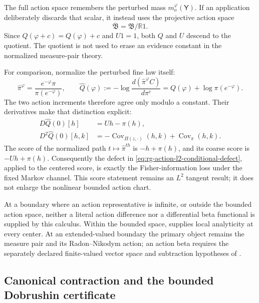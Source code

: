 The full action space remembers the perturbed mass
\(m_o^\varphi(\mathsf Y)\).  If an application deliberately discards that
scalar, it instead uses the projective action space
\begin{equation}
\overline{\mathfrak B}=\mathfrak B/\mathbb R1.
\label{eq:rg-projective-action-space}
\end{equation}
Since \(Q(\varphi+c)=Q(\varphi)+c\) and \(U1=1\), both \(Q\) and \(U\)
descend to the quotient.  The quotient is not used to erase an evidence
constant in the normalized measure-pair theory. 

For comparison, normalize the perturbed fine law itself:
\begin{equation}
\widehat\pi^\varphi
=\frac{e^{-\varphi}\pi}{\pi(e^{-\varphi})},
\qquad
\widehat Q(\varphi)
:=-\log\frac{d(\widehat\pi^\varphi C)}{d\pi^c}
=Q(\varphi)+\log\pi(e^{-\varphi}).
\label{eq:rg-normalized-perturbation-action}
\end{equation}
The two action increments therefore agree only modulo a constant.  Their
derivatives make that distinction explicit:
\begin{align}
D\widehat Q(0)[h]&=Uh-\pi(h),
\label{eq:rg-normalized-action-first-derivative}\\
D^2\widehat Q(0)[h,k]&=
-\operatorname{Cov}_{\Pi(z,\cdot)}(h,k)
+\operatorname{Cov}_{\pi}(h,k).
\label{eq:rg-normalized-action-second-derivative}
\end{align}
The score of the normalized path \(t\mapsto\widehat\pi^{th}\) is
\(-h+\pi(h)\), and its coarse score is
\(-Uh+\pi(h)\).  Consequently the defect in
\eqref{eq:rg-action-l2-conditional-defect}, applied to the centered score,
is exactly the Fisher-information loss under the fixed Markov channel.  This
score statement remains an \(L^2\) tangent result; it does not enlarge the
nonlinear bounded action chart. 

At a boundary where an action representative is infinite, or outside the
bounded action space, neither a literal action difference nor a differential
beta functional is supplied by this calculus.  Within the bounded space,
 supplies local analyticity at every
center.  At an extended-valued boundary the primary object remains the
measure pair and its Radon--Nikodym action; an action beta requires the
separately declared finite-valued vector space and subtraction hypotheses of
. 

\subsection{Canonical contraction and the bounded Dobrushin certificate}
\label{sec:rg-action-contraction}


